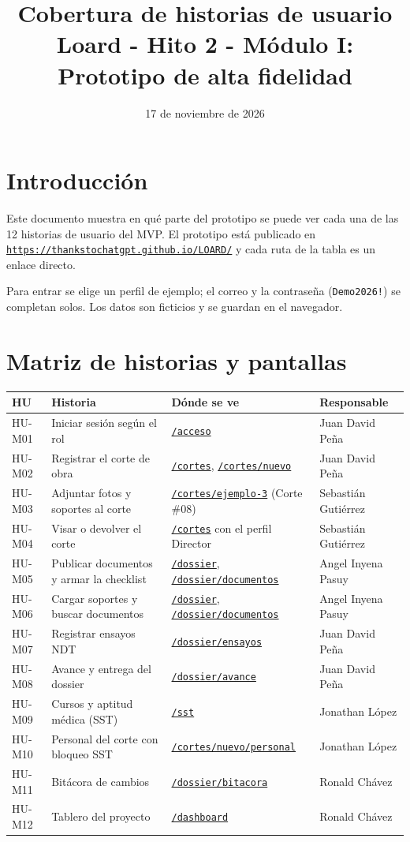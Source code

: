 \documentclass[11pt]{article}
\title{Cobertura de historias de usuario\\[0.3em]
\large Loard - Hito 2 - Módulo I: Prototipo de alta fidelidad}
\author{}
\date{17 de noviembre de 2026}
\newcommand{\urlapp}{https://thankstochatgpt.github.io/LOARD}
\newcommand{\app}[1]{\href{\urlapp#1}{\texttt{#1}}}
\begin{document}
\maketitle

\section{Introducción}

Este documento muestra en qué parte del prototipo se puede ver cada una de las 12 historias de usuario del MVP. El prototipo está publicado en \href{\urlapp/}{\nolinkurl{https://thankstochatgpt.github.io/LOARD/}} y cada ruta de la tabla es un enlace directo.

Para entrar se elige un perfil de ejemplo; el correo y la contraseña (\texttt{Demo2026!}) se completan solos. Los datos son ficticios y se guardan en el navegador.

\section{Matriz de historias y pantallas}

\begin{center}
\small
\begin{tabular}{>{\raggedright\arraybackslash}p{1.4cm} >{\raggedright\arraybackslash}p{4.4cm} >{\raggedright\arraybackslash}p{6.4cm} >{\raggedright\arraybackslash}p{3cm}}
\toprule
\textbf{HU} & \textbf{Historia} & \textbf{Dónde se ve} & \textbf{Responsable} \\ \midrule
HU-M01 & Iniciar sesión según el rol & \app{/acceso} & Juan David Peña \\
HU-M02 & Registrar el corte de obra & \app{/cortes}, \app{/cortes/nuevo} & Juan David Peña \\
HU-M03 & Adjuntar fotos y soportes al corte & \app{/cortes/ejemplo-3} (Corte \#08) & Sebastián Gutiérrez \\
HU-M04 & Visar o devolver el corte & \app{/cortes} con el perfil Director & Sebastián Gutiérrez \\
HU-M05 & Publicar documentos y armar la checklist & \app{/dossier}, \app{/dossier/documentos} & Angel Inyena Pasuy \\
HU-M06 & Cargar soportes y buscar documentos & \app{/dossier}, \app{/dossier/documentos} & Angel Inyena Pasuy \\
HU-M07 & Registrar ensayos NDT & \app{/dossier/ensayos} & Juan David Peña \\
HU-M08 & Avance y entrega del dossier & \app{/dossier/avance} & Juan David Peña \\
HU-M09 & Cursos y aptitud médica (SST) & \app{/sst} & Jonathan López \\
HU-M10 & Personal del corte con bloqueo SST & \app{/cortes/nuevo/personal} & Jonathan López \\
HU-M11 & Bitácora de cambios & \app{/dossier/bitacora} & Ronald Chávez \\
HU-M12 & Tablero del proyecto & \app{/dashboard} & Ronald Chávez \\
\bottomrule
\end{tabular}
\end{center}
\end{document}

